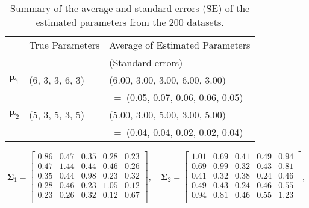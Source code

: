 \documentclass[12pt]{article}
\newcommand{\bmu}{\boldsymbol{\mu}}
\newcommand{\bSigma}{\boldsymbol{\Sigma}}
\begin{document}
\begin{table}[!ht]
\caption{Summary of the average and standard errors (SE) of the estimated parameters from the 200 datasets.}
\begin{center}
	\begin{tabular*}{0.95\textwidth}{@{\extracolsep{\fill}}lll}
	\hline
	& True Parameters & Average of Estimated Parameters \\
	&&(Standard errors)\\
	\hline
	$\bmu_1$&(6, 3, 3, 6, 3)&(6.00, 3.00, 3.00, 6.00, 3.00)\\
	&&\text{SE}~=~(0.05, 0.07, 0.06, 0.06, 0.05)\\[5pt]
	$\bmu_2$&(5, 3, 5, 3, 5)&(5.00, 3.00, 5.00, 3.00, 5.00)\\
	&&\text{SE}~=~(0.04, 0.04, 0.02, 0.02, 0.04)\\
	\hline
\end{tabular*}
\end{center}



\begin{equation*}
\bSigma_1 =
\begin{bmatrix}
 0.86 & 0.47 & 0.35 & 0.28 & 0.23 \\ 
0.47 & 1.44 & 0.44 & 0.46 & 0.26 \\ 
0.35 & 0.44 & 0.98 & 0.23 & 0.32 \\ 
0.28 & 0.46 & 0.23 & 1.05 & 0.12 \\ 
0.23 & 0.26 & 0.32 & 0.12 & 0.67 \\
\end{bmatrix}, \quad
\bSigma_2 =
\begin{bmatrix}
1.01 & 0.69 & 0.41 & 0.49 & 0.94 \\ 
0.69 & 0.99 & 0.32 & 0.43 & 0.81 \\ 
0.41 & 0.32 & 0.38 & 0.24 & 0.46 \\ 
0.49 & 0.43 & 0.24 & 0.46 & 0.55 \\ 
0.94 & 0.81 & 0.46 & 0.55 & 1.23 \\ 
\end{bmatrix},
\end{equation*}


\end{table}
\end{document}
